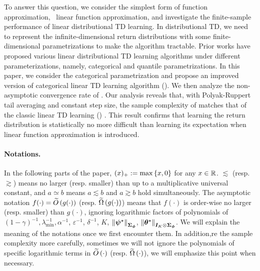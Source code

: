 To answer this question, we consider the simplest form of function approximation, \ie\  linear function approximation, and investigate the finite-sample performance of linear distributional TD learning.
In distributional TD, we need to represent the infinite-dimensional return distributions with some finite-dimensional parametrizations to make the algorithm tractable.
Prior works \citep{bellemare2019distributional,lyle2019comparative,bdr2022} have proposed various linear distributional TD learning algorithms under different parameterizations, namely, categorical and quantile parametrizations.
In this paper, we consider the categorical parametrization and propose an improved version of categorical linear TD learning algorithm (\LCTD).
We then analyze the non-asymptotic convergence rate of {\LCTD}.
Our analysis reveals that, with Polyak-Ruppert tail averaging \citep{ruppert1988efficient,polyak1992acceleration} and constant step size, the sample complexity of {\LCTD} matches that of the classic linear TD learning (\LTD) \citep{li2024high,samsonov2024improved}.
This result confirms that learning the return distribution is statistically no more difficult than learning its expectation when linear function approximation is introduced.

\paragraph{Notations.}
In the following parts of the paper, $(x)_+:=\max\left\{{x,0}\right\}$ for any $x\in{\mathbb R}$.
$\lesssim$ (resp. $\gtrsim$) means no larger (resp. smaller) than up to a multiplicative universal constant, and $a\simeq b$ means $a\lesssim b$ and $a\gtrsim b$ hold simultaneously.
The asymptotic notation $f(\cdot)=\widetilde{O}\left({g(\cdot)}\right)$ (resp. $\widetilde{\Omega}\left({g(\cdot)}\right)$)
means that $f(\cdot)$ is order-wise no larger (resp. smaller) than $g(\cdot)$, ignoring logarithmic factors of polynomials of $(1-\gamma)^{-1}, \lambda_{\min}^{-1}, \alpha^{-1}$, $\varepsilon^{-1}$, $\delta^{-1}$, $K$, $\left\|{{\bm{\psi}}^\star}\right\|_{{\bm{\Sigma}}_{{\bm{\phi}}}}$, $\left\|{{\bm{\theta}}^{\star}}\right\|_{{\bm{I}}_K\otimes{\bm{\Sigma}}_{{\bm{\phi}}}}$. 
We will explain the meaning of the notations once we first encounter them.
In addition,re the sample complexity more carefully, sometimes we will not ignore the polynomials of specific logarithmic terms in $\widetilde{O}\left({\cdot}\right)$ (resp. $\widetilde{\Omega}\left({\cdot}\right)$), we will emphasize this point when necessary.

